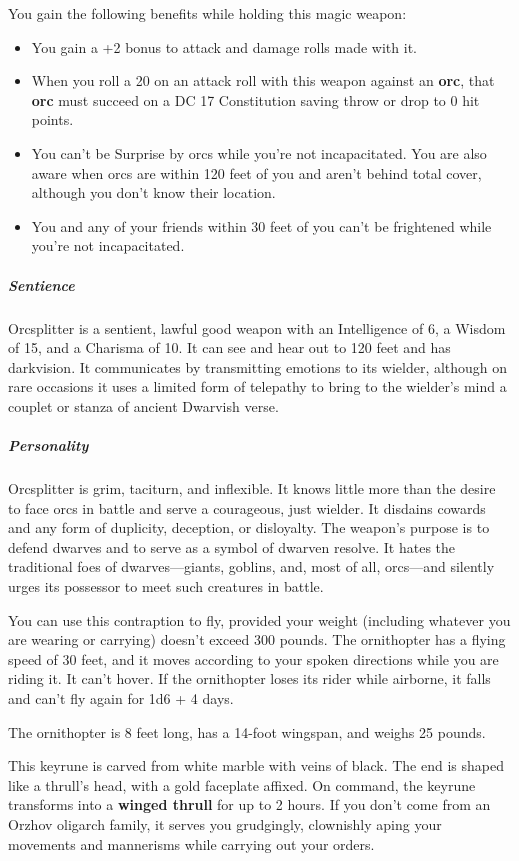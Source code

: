 \documentclass[10pt,a4paper,twoside,bg=print,twocolumn,openany,nodeprecatedcode]{dndbook}
\begin{document}
You gain the following benefits while holding this magic weapon:


\begin{itemize}
\item You gain a +2 bonus to attack and damage rolls made with it.
\item When you roll a 20 on an attack roll with this weapon against an \textbf{orc}, that \textbf{orc} must succeed on a DC 17 Constitution saving throw or drop to 0 hit points.
\item You can't be Surprise by orcs while you're not incapacitated. You are also aware when orcs are within 120 feet of you and aren't behind total cover, although you don't know their location.
\item You and any of your friends within 30 feet of you can't be frightened while you're not incapacitated.
\end{itemize}

\subparagraph{Sentience}
Orcsplitter is a sentient, lawful good weapon with an Intelligence of 6, a Wisdom of 15, and a Charisma of 10. It can see and hear out to 120 feet and has darkvision. It communicates by transmitting emotions to its wielder, although on rare occasions it uses a limited form of telepathy to bring to the wielder's mind a couplet or stanza of ancient Dwarvish verse.

\subparagraph{Personality}
Orcsplitter is grim, taciturn, and inflexible. It knows little more than the desire to face orcs in battle and serve a courageous, just wielder. It disdains cowards and any form of duplicity, deception, or disloyalty. The weapon's purpose is to defend dwarves and to serve as a symbol of dwarven resolve. It hates the traditional foes of dwarves—giants, goblins, and, most of all, orcs—and silently urges its possessor to meet such creatures in battle.

You can use this contraption to fly, provided your weight (including whatever you are wearing or carrying) doesn't exceed 300 pounds. The ornithopter has a flying speed of 30 feet, and it moves according to your spoken directions while you are riding it. It can't hover. If the ornithopter loses its rider while airborne, it falls and can't fly again for 1d6 + 4 days.

The ornithopter is 8 feet long, has a 14-foot wingspan, and weighs 25 pounds.

This keyrune is carved from white marble with veins of black. The end is shaped like a thrull's head, with a gold faceplate affixed. On command, the keyrune transforms into a \textbf{winged thrull} for up to 2 hours. If you don't come from an Orzhov oligarch family, it serves you grudgingly, clownishly aping your movements and mannerisms while carrying out your orders.
\end{document}
